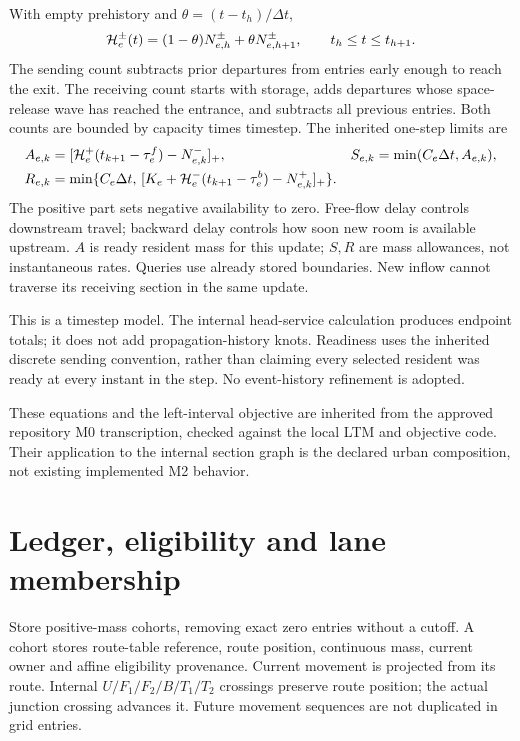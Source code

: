 \documentclass[10pt,a4paper]{article}
\newcommand{\pos}[1]{[#1]_+}
\begin{document}
With empty prehistory and $\theta=(t-t_h)/\Delta t$,
\begin{equation}
 {\cal H}^{\pm}_e(t)
 =(1-\theta)N^\pm_{e,h}+\theta N^\pm_{e,h+1},
 \qquad t_h\leq t\leq t_{h+1}.
 \label{eq:history}
\end{equation}
The sending count subtracts prior departures from entries early enough
to reach the exit. The receiving count starts with storage, adds departures
whose space-release wave has reached the entrance, and subtracts all
previous entries. Both counts are bounded by capacity times timestep.
The inherited one-step limits are
\begin{align}
 A_{e,k}&=\pos{{\cal H}^+_e(t_{k+1}-\tau^f_e)-N^-_{e,k}},
 &S_{e,k}&=\min(C_e\Delta t,A_{e,k}),\label{eq:sending}\\
 R_{e,k}&=\min\{C_e\Delta t,\,
 \pos{K_e+{\cal H}^-_e(t_{k+1}-\tau^b_e)-N^+_{e,k}}\}.
 \label{eq:receiving}
\end{align}
The positive part sets negative availability to zero. Free-flow delay
controls downstream travel; backward delay controls how soon new room
is available upstream. $A$ is ready resident mass for this update;
$S,R$ are mass allowances,
not instantaneous rates. Queries use already stored boundaries.
New inflow cannot traverse its receiving section in the same update.

This is a timestep model. The internal head-service calculation produces
endpoint totals; it does not add propagation-history knots.
Readiness uses the inherited discrete sending convention, rather than
claiming every selected resident was ready at every instant in the step.
No event-history refinement is adopted.

These equations and the left-interval objective are inherited from the
approved repository M0 transcription, checked against the local LTM and
objective code. Their application to the internal section graph is the
declared urban composition, not existing implemented M2 behavior.

\section{Ledger, eligibility and lane membership}

Store positive-mass cohorts, removing exact zero entries without a cutoff.
A cohort stores route-table reference, route position, continuous mass,
current owner and affine eligibility provenance. Current movement is
projected from its route. Internal $U/F_1/F_2/B/T_1/T_2$ crossings preserve route
position; the actual junction crossing advances it. Future movement
sequences are not duplicated in grid entries.
\end{document}
